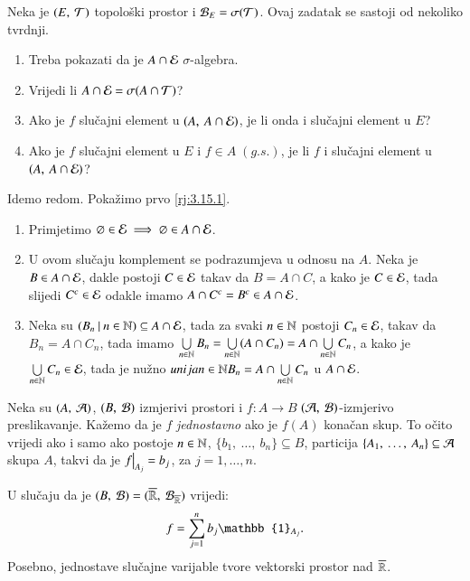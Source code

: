 \begin{rj}  \label{rj:3.15}
    Neka je $({E}, \: {\mathcal{T}})$ topolo\v ski prostor i $\mathcal{B}_{E} = \sigma({\mathcal{T}})$.
    Ovaj zadatak se sastoji od nekoliko tvrdnji.
    \begin{enumerate}[label=(\arabic*)]
        \item \label{rj:3.15.1}
        Treba pokazati da je $ A \cap \mathcal{E}$ $\sigma$-algebra.
        \item \label{rj:3.15.2}
        Vrijedi li $A \cap \mathcal{E} = \sigma({A \cap \mathcal{T}})$?
        \item \label{rj:3.15.3}
        Ako je $f$ slu\v cajni element u $({A}, \: {A \cap \mathcal{E}})$, je li onda i slu\v cajni element u $E$?
        \item \label{rj:3.15.4}
        Ako je $f$ slu\v cajni element u $E$ i $f \in A \; (g.s.)$, je li $f$ i slu\v cajni element u $({A}, \: {A \cap \mathcal{E}})$?
    \end{enumerate}
    Idemo redom.
    Poka\v zimo prvo \ref{rj:3.15.1}.
    \begin{enumerate}[label=(\roman*)]
        \item Primjetimo $\varnothing \in \mathcal{E} \implies \varnothing \in A \cap \mathcal{E}$.
        \item U ovom slu\v caju komplement se podrazumjeva u odnosu na $A$.
        Neka je $B \in A \cap \mathcal{E}$, dakle postoji $C \in \mathcal{E}$ takav da $B = A \cap C$, a kako je $C \in \mathcal{E}$, tada slijedi $C^c \in \mathcal{E}$ odakle imamo $A \cap C^c = B^c \in A \cap \mathcal{E}$.
        \item Neka su $({B_n} \: | \: {n \in \mathbb{N}}) \subseteq A \cap \mathcal{E}$, tada za svaki $n \in \mathbb{N}$ postoji $C_n \in \mathcal{E}$, takav da $B_n = A \cap C_n$, tada imamo $\bigcup\limits_{n \in \mathbb{N}}^{} B_n = \bigcup\limits_{n \in \mathbb{N}}^{} (A \cap C_n) = A \cap \bigcup\limits_{n \in \mathbb{N}}^{} C_n$, a kako je $\bigcup\limits_{n \in \mathbb{N}}^{} C_n \in \mathcal{E}$, tada je nu\v zno $unija{n \in \mathbb{N}}{} B_n = A \cap \bigcup\limits_{n \in \mathbb{N}}^{} C_n$ u $A \cap \mathcal{E}$.
    \end{enumerate}
\end{rj}


\begin{pr}  \label{pr:3.16}
    Neka su $(A, \: \mathcal{A})$, $(B, \: \mathcal{B})$ izmjerivi prostori i $f: A \to B$ $(\mathcal{A}, \: \mathcal{B})$-izmjerivo preslikavanje.
    Ka\v zemo da je $f$ \emph{jednostavno} ako je $f(A)$ kona\v can skup. To o\v cito vrijedi ako i samo ako postoje $n \in \mathbb{N}$, $\{ b_1, \: \dots, \: b_n \} \subseteq B$, particija $\{ A_1, \: \dots, \: A_n \} \subseteq \mathcal{A}$ skupa $A$, takvi da je $\restr{f}{A_j} = b_j$, za $j = 1, \dots, n$.
    
    U slu\v caju da je $(B, \: \mathcal{B}) = (\overline{\mathbb{R}}, \: \mathcal{B}_{\overline{\mathbb{R}}})$ vrijedi:
    \begin{equation*}
        f = \suma{j = 1}{n} b_j \mathbb{1}_{A_j}.
    \end{equation*}
    Posebno, jednostave slu\v cajne varijable tvore vektorski prostor nad $\overline{\mathbb{R}}$.
\end{pr}

